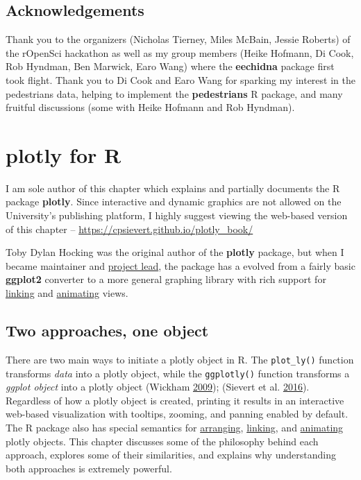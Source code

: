 \documentclass[12pt,]{isuthesis}
\begin{document}
\section{Acknowledgements}\label{acknowledgements-1}

Thank you to the organizers (Nicholas Tierney, Miles McBain, Jessie
Roberts) of the rOpenSci hackathon as well as my group members (Heike
Hofmann, Di Cook, Rob Hyndman, Ben Marwick, Earo Wang) where the
\textbf{eechidna} package first took flight. Thank you to Di Cook and
Earo Wang for sparking my interest in the pedestrians data, helping to
implement the \textbf{pedestrians} R package, and many fruitful
discussions (some with Heike Hofmann and Rob Hyndman).

\chapter{plotly for R}

I am sole author of this chapter which explains and partially documents
the R package \textbf{plotly}. Since interactive and dynamic graphics
are not allowed on the University's publishing platform, I highly
suggest viewing the web-based version of this chapter --
\url{https://cpsievert.github.io/plotly_book/}

Toby Dylan Hocking was the original author of the \textbf{plotly}
package, but when I became maintainer and
\href{https://github.com/ropensci/plotly/graphs/contributors?from=2015-01-12\&to=2016-11-28\&type=c}{project
lead}, the package has a evolved from a fairly basic \textbf{ggplot2}
converter to a more general graphing library with rich support for
\protect\hyperlink{multiple-linked-views}{linking} and
\protect\hyperlink{animating-views}{animating} views.

\section{Two approaches, one object}\label{two-approaches-one-object}

There are two main ways to initiate a plotly object in R. The
\texttt{plot\_ly()} function transforms \emph{data} into a plotly
object, while the \texttt{ggplotly()} function transforms a \emph{ggplot
object} into a plotly object (Wickham
\protect\hyperlink{ref-ggplot2}{2009}); (Sievert et al.
\protect\hyperlink{ref-plotly}{2016}). Regardless of how a plotly object
is created, printing it results in an interactive web-based
visualization with tooltips, zooming, and panning enabled by default.
The R package also has special semantics for
\protect\hyperlink{arranging-multiple-views}{arranging},
\protect\hyperlink{multiple-linked-views}{linking}, and
\protect\hyperlink{animating-views}{animating} plotly objects. This
chapter discusses some of the philosophy behind each approach, explores
some of their similarities, and explains why understanding both
approaches is extremely powerful.
\end{document}
